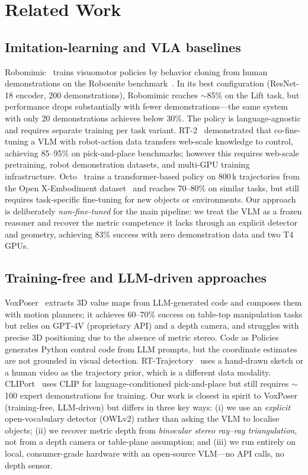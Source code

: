 \documentclass[conference]{IEEEtran}
\begin{document}
\section{Related Work}
\label{sec:related}

\subsection{Imitation-learning and VLA baselines}

Robomimic~\cite{robomimic} trains visuomotor policies by behavior cloning from human demonstrations on the Robosuite benchmark~\cite{robosuite}. In its best configuration (ResNet-18 encoder, 200 demonstrations), Robomimic reaches $\sim$85\% on the Lift task, but performance drops substantially with fewer demonstrations---the same system with only 20 demonstrations achieves below 30\%. The policy is language-agnostic and requires separate training per task variant. RT-2~\cite{rt2} demonstrated that co-fine-tuning a VLM with robot-action data transfers web-scale knowledge to control, achieving 85--95\% on pick-and-place benchmarks; however this requires web-scale pretraining, robot demonstration datasets, and multi-GPU training infrastructure. Octo~\cite{octo} trains a transformer-based policy on 800\,k trajectories from the Open X-Embodiment dataset~\cite{openx} and reaches 70--80\% on similar tasks, but still requires task-specific fine-tuning for new objects or environments. Our approach is deliberately \emph{non-fine-tuned} for the main pipeline: we treat the VLM as a frozen reasoner and recover the metric competence it lacks through an explicit detector and geometry, achieving 83\% success with zero demonstration data and two T4 GPUs.

\subsection{Training-free and LLM-driven approaches}

VoxPoser~\cite{voxposer} extracts 3D value maps from LLM-generated code and composes them with motion planners; it achieves 60--70\% success on table-top manipulation tasks but relies on GPT-4V (proprietary API) and a depth camera, and struggles with precise 3D positioning due to the absence of metric stereo. Code as Policies~\cite{cap} generates Python control code from LLM prompts, but the coordinate estimates are not grounded in visual detection. RT-Trajectory~\cite{rtt} uses a hand-drawn sketch or a human video as the trajectory prior, which is a different data modality. CLIPort~\cite{cliport} uses CLIP for language-conditioned pick-and-place but still requires $\sim$100 expert demonstrations for training. Our work is closest in spirit to VoxPoser (training-free, LLM-driven) but differs in three key ways: (i) we use an \emph{explicit} open-vocabulary detector (OWLv2) rather than asking the VLM to localise objects; (ii) we recover metric depth from \emph{binocular stereo ray--ray triangulation}, not from a depth camera or table-plane assumption; and (iii) we run entirely on local, consumer-grade hardware with an open-source VLM---no API calls, no depth sensor.
\end{document}
